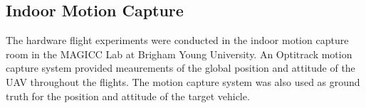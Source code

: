 
\subsection{Indoor Motion Capture}
The hardware flight experiments were conducted in the indoor motion capture room
in the MAGICC Lab at Brigham Young University. An Optitrack motion capture
system provided meaurements of the global position and attitude of the UAV
throughout the flights. The motion capture system was also used as ground truth
for the position and attitude of the target vehicle.

